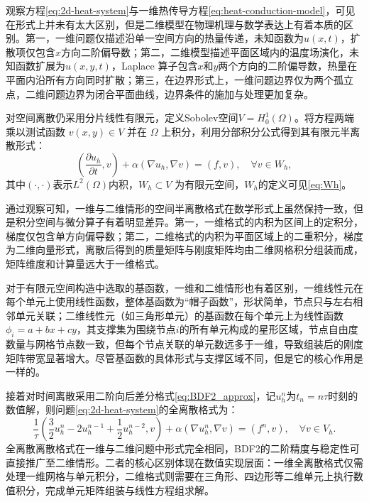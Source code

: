 \documentclass{GZUbachelorthesis}
\theoremstyle{chineseplain}
\begin{document}
观察方程\eqref{eq:2d-heat-system}与一维热传导方程\eqref{eq:heat-conduction-model}，可见在形式上并未有太大区别，但是二维模型在物理机理与数学表达上有着本质的区别。第一，一维问题仅描述沿单一空间方向的热量传递，未知函数为$u(x,t)$，扩散项仅包含$x$方向二阶偏导数；第二，二维模型描述平面区域内的温度场演化，未知函数扩展为$u(x,y,t)$，Laplace 算子包含$x$和$y$两个方向的二阶偏导数，热量在平面内沿所有方向同时扩散；第三，在边界形式上，一维问题边界仅为两个孤立点，二维问题边界为闭合平面曲线，边界条件的施加与处理更加复杂。

对空间离散仍采用分片线性有限元，定义Sobolev空间$V = H^1_0(\Omega)$。将方程两端乘以测试函数 $v(x,y) \in V$ 并在 $\Omega$ 上积分，利用分部积分公式得到其有限元半离散形式：
\begin{equation}
	\left( \frac{\partial u_h}{\partial t}, v \right) + \alpha (\nabla u_h, \nabla v) = (f, v), \quad \forall v \in W_h, \label{eq:semidiscrete-weak}
\end{equation}
其中$(\cdot, \cdot)$表示$L^2(\Omega)$内积，$W_h \subset V$ 为有限元空间，$W_h$的定义可见\eqref{eq:Wh}。

通过观察可知，一维与二维情形的空间半离散格式在数学形式上虽然保持一致，但是积分空间与微分算子有着明显差异。第一，一维格式的内积为区间上的定积分，梯度仅包含单方向偏导数；第二，二维格式的内积为平面区域上的二重积分，梯度为二维向量形式，离散后得到的质量矩阵与刚度矩阵均由二维网格积分组装而成，矩阵维度和计算量远大于一维格式。

对于有限元空间构造中选取的基函数，一维和二维情形也有着区别，一维线性元在每个单元上使用线性函数，整体基函数为“帽子函数”，形状简单，节点只与左右相邻单元关联；二维线性元（如三角形单元）的基函数在每个单元上为线性函数$\phi_i=a+bx+cy$，其支撑集为围绕节点$i$的所有单元构成的星形区域，节点自由度数量与网格节点数一致，但每个节点关联的单元数远多于一维，导致组装后的刚度矩阵带宽显著增大。尽管基函数的具体形式与支撑区域不同，但是它的核心作用是一样的。

接着对时间离散采用二阶向后差分格式\eqref{eq:BDF2_approx}，记$u_h^n$为$t_n = n\tau$时刻的数值解，则问题\eqref{eq:2d-heat-system}的全离散格式为：
\begin{equation}
	\frac{1}{\tau} \left( \frac{3}{2} u_h^{n} - 2 u_h^{n-1} + \frac{1}{2} u_h^{n-2}, v \right) 
	+ \alpha (\nabla u_h^{n}, \nabla v) = (f^{n}, v), \quad \forall v \in V_h.\label{eq:bdf2-scheme}
\end{equation}
全离散离散格式在一维与二维问题中形式完全相同，BDF2的二阶精度与稳定性可直接推广至二维情形。二者的核心区别体现在数值实现层面：一维全离散格式仅需处理一维网格与单元积分，二维格式则需要在三角形、四边形等二维单元上执行数值积分，完成单元矩阵组装与线性方程组求解。
\end{document}
